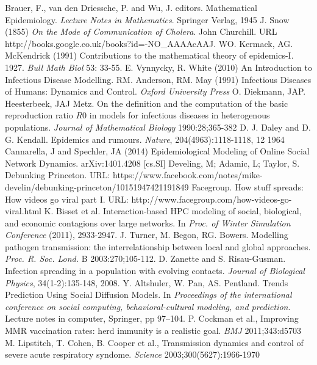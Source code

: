 \documentclass[11pt, a4paper, oneside,titlepage]{article}
\begin{document}
\begin{thebibliography}{1}
	 Brauer, F., van den Driessche, P. and Wu, J. editors.  Mathematical Epidemiology. \emph{Lecture Notes in Mathematics}. Springer Verlag, 1945 
	J. Snow (1855) \emph{On the Mode of Communication of Cholera}. John Churchill. URL http://books.google.co.uk/books?id=-NO\_AAAAcAAJ.
	WO. Kermack, AG. McKendrick (1991) Contributions to the mathematical theory of epidemics-I. 1927. \emph{Bull Math Biol} 53: 33-55.
	E. Vynnycky, R. White (2010) An Introduction to Infectious Disease Modelling.
	RM. Anderson, RM. May (1991) Infectious Diseases of Humans: Dynamics and Control. \emph{Oxford University Press}
	O. Diekmann, JAP. Heesterbeek, JAJ Metz. On the definition and the computation of the basic reproduction ratio $R0$ in models for infectious diseases in heterogenous populations. \emph{Journal of Mathematical Biology} 1990:28;365-382
	D. J. Daley and D. G. Kendall. Epidemics and rumours. \emph{Nature}, 204(4963):1118-1118, 12 1964
	Cannarella, J and Spechler, JA (2014) Epidemiological Modeling of Online Social Network Dynamics. arXiv:1401.4208 [cs.SI]
Develing, M; Adamic, L; Taylor, S. Debunking Princeton. URL: https://www.facebook.com/notes/mike-develin/debunking-princeton/10151947421191849
	Facegroup. How stuff spreads: How videos go viral part I. URL: http://www.facegroup.com/how-videos-go-viral.html	
	K. Bisset et al. Interaction-based HPC modeling of social, biological, and economic contagions over large networks. In \emph{Proc. of Winter Simulation Conference} (2011), 2933-2947.
	J. Turner, M. Begon, RG. Bowers. Modelling pathogen transmission: the interrelationship between local and global approaches. \emph{Proc. R. Soc. Lond.} B 2003:270;105-112.
	D. Zanette and S. Risau-Gusman. Infection spreading in a population with evolving contacts. \emph{Journal of Biological Physics}, 34(1-2):135-148, 2008.
	Y. Altshuler, W. Pan, AS. Pentland. Trends Prediction Using Social Diffusion Models. In \emph{Proceedings of the international conference on social computing, behavioral-cultural modeling, and prediction}. Lecture notes in computer, Springer, pp 97–104.
	P. Cockman et al., Improving MMR vaccination rates: herd immunity is a realistic goal. \emph{BMJ} 2011;343:d5703
	M. Lipstitch, T. Cohen, B. Cooper et al., Transmission dynamics and control of severe acute respiratory syndome. \emph{Science} 2003;300(5627):1966-1970

\end{thebibliography}
\end{document}
